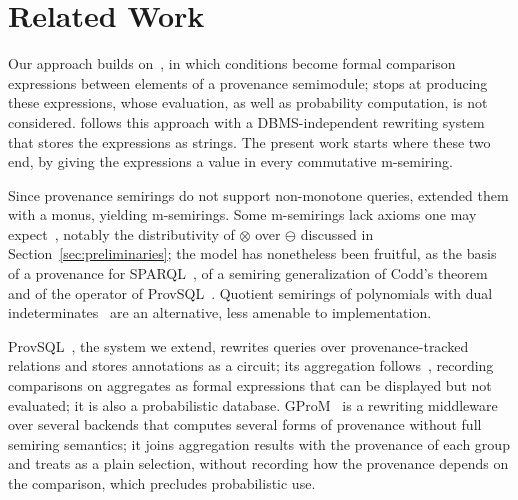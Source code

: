 \section{Related Work}
\label{sec:related_work}

Our approach builds on~\cite{amsterdamer2011provenance}, in which
 conditions become formal comparison expressions between
elements of a provenance semimodule; \cite{amsterdamer2011provenance}
stops at producing these expressions, whose evaluation, as well as
probability computation, is not considered. \cite{pintor2025dbms}
follows this approach with a DBMS-independent rewriting system that
stores the expressions as strings. The present work starts where these
two end, by giving the expressions a value in every commutative
m-semiring.

Since provenance semirings \cite{green2007provenance,green2017provenance}
do not support non-monotone queries, \cite{geerts2010database} extended
them with a monus, yielding m-semirings. Some m-semirings lack axioms one
may expect~\cite{amsterdamer2011limitations}, notably the distributivity
of $\otimes$ over $\ominus$ discussed in Section~\ref{sec:preliminaries};
the model has nonetheless been fruitful, as the basis of a provenance for
SPARQL~\cite{DBLP:journals/jacm/GeertsUKFC16}, of a semiring
generalization of Codd's theorem~\cite{badia2025codd} and of the
 operator of ProvSQL~\cite{sen2026provsql}. Quotient
semirings of polynomials with dual
indeterminates~\cite{gradel2025provenance} are an alternative, less
amenable to implementation.

ProvSQL~\cite{sen2026provsql}, the system we extend, rewrites queries
over provenance-tracked relations and stores annotations as a circuit;
its aggregation follows~\cite{amsterdamer2011provenance}, recording
comparisons on aggregates as formal expressions that can be displayed but
not evaluated; it is also a probabilistic database.
GProM~\cite{arab2018gprom} is a rewriting middleware over several
backends that computes several forms of provenance without full semiring
semantics; it joins aggregation results with the provenance of each group
and treats  as a plain selection, without recording how the
provenance depends on the comparison, which precludes probabilistic use.

